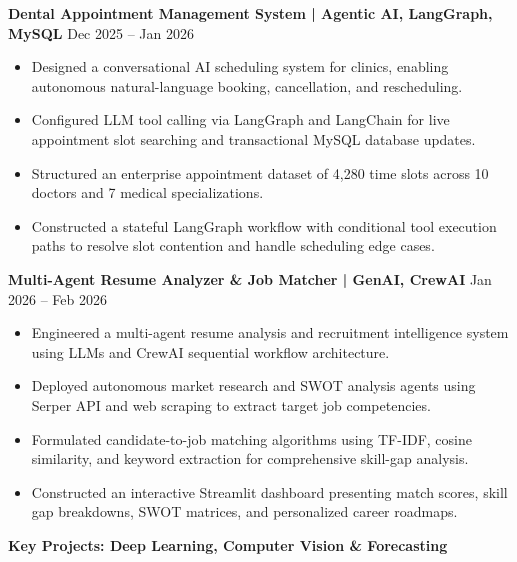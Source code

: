 \documentclass[10pt]{article}
\begin{document}
\textbf{Dental Appointment Management System | Agentic AI, LangGraph, MySQL} \hfill Dec 2025 -- Jan 2026
\begin{itemize}[noitemsep, topsep=2pt, partopsep=0pt, parsep=1.5pt]
    \item Designed a conversational AI scheduling system for clinics, enabling autonomous natural-language booking, cancellation, and rescheduling.
    \item Configured LLM tool calling via LangGraph and LangChain for live appointment slot searching and transactional MySQL database updates.
    \item Structured an enterprise appointment dataset of 4,280 time slots across 10 doctors and 7 medical specializations.
    \item Constructed a stateful LangGraph workflow with conditional tool execution paths to resolve slot contention and handle scheduling edge cases.
\end{itemize}

\vspace{6pt}

\textbf{Multi-Agent Resume Analyzer \& Job Matcher | GenAI, CrewAI} \hfill Jan 2026 -- Feb 2026
\begin{itemize}[noitemsep, topsep=2pt, partopsep=0pt, parsep=1.5pt]
    \item Engineered a multi-agent resume analysis and recruitment intelligence system using LLMs and CrewAI sequential workflow architecture.
    \item Deployed autonomous market research and SWOT analysis agents using Serper API and web scraping to extract target job competencies.
    \item Formulated candidate-to-job matching algorithms using TF-IDF, cosine similarity, and keyword extraction for comprehensive skill-gap analysis.
    \item Constructed an interactive Streamlit dashboard presenting match scores, skill gap breakdowns, SWOT matrices, and personalized career roadmaps.
\end{itemize}

\newpage

\begin{center}
    \textbf{Key Projects: Deep Learning, Computer Vision \& Forecasting}
\end{center}
\vspace{-4pt}
\end{document}
